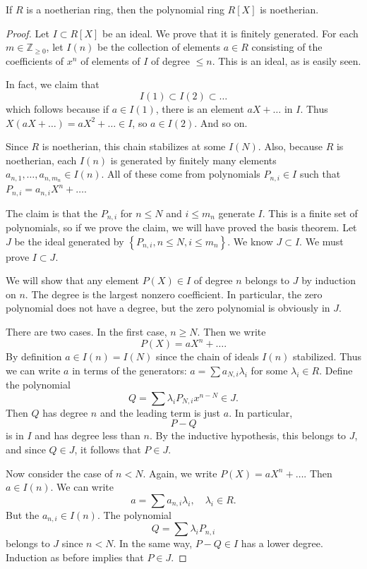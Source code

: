 \begin{theorem}
If $R$ is a noetherian ring, then the polynomial ring $R[X]$ is noetherian.
\end{theorem} 
\begin{proof} 
Let $I \subset R[X]$ be an ideal. We prove that it is finitely generated. For
each $m \in \mathbb{Z}_{\geq 0}$, let $I(n)$ be the collection of elements 
$ a\in R$ consisting of the coefficients of $x^n$ of elements of $I$ of degree
$\leq n$.
This is an ideal, as is easily seen.

In fact, we claim that
\[ I(1) \subset I(2) \subset \dots  \]
which follows because if $ a\in I(1)$, there is an element $aX + \dots$ in $I$.
Thus $X(aX + \dots) = aX^2 + \dots \in I$, so $a \in I(2)$. And so on.

Since $R$ is noetherian, this chain stabilizes at some $I(N). $
Also, because $R$ is noetherian, each $I(n)$ is generated by finitely many
elements $a_{n,1}, \dots, a_{n, m_n} \in I(n)$. All of these come from polynomials
$P_{n,i} \in I$ such that $P_{n,i} = a_{n,i} X^n + \dots$.

The claim is that the $P_{n,i}$ for $n \leq N$ and $i \leq m_n$ generate $I$. 
This is a finite set of polynomials, so if we prove the claim, we will have
proved the basis theorem. Let $J$ be the ideal generated by
$\left\{P_{n,i}, n \leq N, i \leq m_n \right\}$. We know $J \subset I$. We must
prove $I \subset J$.

We will show that any element $P(X) \in I$ of degree $n$ belongs to $J$ by
induction on $n$. The degree is the largest nonzero coefficient. In particular,
the zero polynomial does not have a degree, but the zero polynomial is
obviously in $J$.

There are two cases. In the first case, $n \geq N$. Then we write
\[ P(X) = a X^n + \dots .  \] By definition $a \in I(n) = I(N)$ since the
chain of ideals $I(n)$ stabilized. Thus we can write $a$ in terms of the
generators:  $a = \sum a_{N, i} \lambda_i$ for some
$\lambda_i \in R$. Define the polynomial
\[ Q = \sum \lambda_i P_{N, i} x^{n-N} \in J.  \] Then $Q$ has degree $n$ and
the leading term is just $a$.  In particular, 
\[ P - Q  \]
is in $I$ and has degree less than $n$. By the inductive hypothesis, this
belongs to $J$, and since $Q \in J$, it follows that $P \in J$. 

Now consider the case of $n < N$. 
Again, we write $P(X) = a X^n + \dots$. Then $a \in I(n)$.  We can write 
\[ a = \sum a_{n,i} \lambda_i, \quad \lambda_i \in R.  \]
But the $a_{n,i} \in I(n)$. The polynomial
\[ Q = \sum \lambda_i P_{n,i}   \]
belongs to $J$ since $n  < N$. In the same way, $P-Q \in I$ has a lower degree.
Induction as before implies that $P \in J$. 
\end{proof} 


